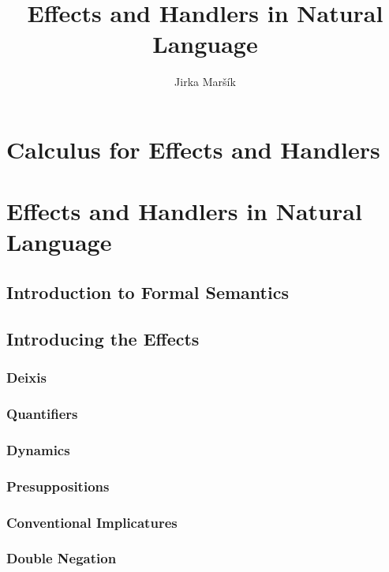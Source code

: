 \documentclass{report}
\title{Effects and Handlers in Natural Language}
\author{Jirka Maršík}
\begin{document}
\maketitle

\tableofcontents



\part{Calculus for Effects and Handlers}









\part{Effects and Handlers in Natural Language}

\chapter{Introduction to Formal Semantics}
\label{chap:intro-fs}

\chapter{Introducing the Effects}
\section{Deixis}
\section{Quantifiers}

\section{Dynamics}
\section{Presuppositions}
\section{Conventional Implicatures}
\section{Double Negation}







\end{document}
